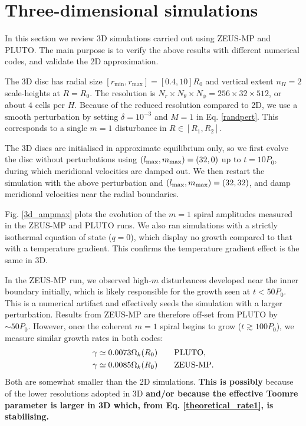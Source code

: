 \section{Three-dimensional simulations}\label{results3d}
In this section we review 3D simulations carried 
out using ZEUS-MP and PLUTO. The main purpose is to verify 
the above results with different numerical codes, and validate  
the 2D approximation.    

The 3D disc has radial size
$[r_\mathrm{min},r_\mathrm{max}]=[0.4,10]R_0$ and vertical extent  
$n_H=2$ scale-heights at $R=R_0$. The resolution is $N_r\times N_\theta\times
N_\phi=256\times32\times512$, or about $4$ cells per
$H$. Because of the reduced resolution 
compared to 2D, we use a smooth perturbation by setting
$\delta = 10^{-3}$ and $M=1$ in Eq. \ref{randpert}. This corresponds
to a single $m=1$ disturbance in $R\in[R_1,R_2]$.


The 3D discs are initialised in approximate equilibrium only, so we
first evolve the disc without perturbations using  
$(l_\mathrm{max},m_\mathrm{max})=(32,0)$ up to $t=10P_0$, during which 
meridional velocities are damped out. We then restart the simulation
with the above perturbation and $(l_\mathrm{max},m_\mathrm{max})=(32,32)$, and damp
meridional velocities near the radial boundaries. 

Fig. \ref{3d_ampmax} plots the evolution of the $m=1$ spiral amplitudes measured
in the ZEUS-MP and PLUTO runs. We also ran simulations
with a strictly isothermal equation of state ($q=0$), which display no
growth compared to that with a temperature gradient.  This confirms
the temperature gradient effect is the same in 3D. 


In the ZEUS-MP run, we observed high-$m$ disturbances developed near 
the inner boundary initially, which is likely responsible for the
growth seen at $t<50P_0$. This is a numerical artifact and effectively
seeds the simulation with a larger perturbation. Results
from ZEUS-MP are therefore off-set from PLUTO by $\sim50P_0$. However,
once the coherent $m=1$ spiral begins to grow ($t\gtrsim 100P_0$), 
we measure similar growth rates in both codes: 
\begin{align*}
  &\gamma \simeq 0.0073\Omega_k(R_0) \quad\quad \mathrm{PLUTO},\\
  &\gamma \simeq 0.0085\Omega_k(R_0) \quad\quad {\operatorname{ZEUS-MP}}.
\end{align*}
Both are somewhat smaller than the 2D simulations. {\bf This is
  possibly} because of the lower resolutions adopted in 3D {\bf
  and/or because the effective Toomre parameter is larger in 3D
  \citep{mamat10} which, from Eq. \ref{theoretical_rate1}, is
  stabilising.}  

